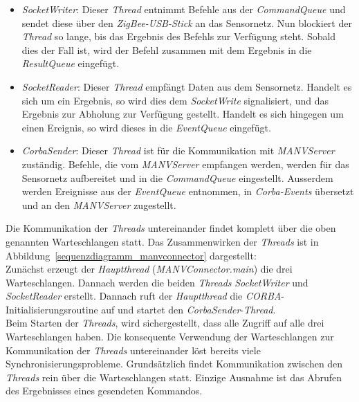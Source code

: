\begin{itemize}
    \item{\emph{SocketWriter}:} Dieser \emph{Thread} entnimmt Befehle aus der \emph{CommandQueue} und sendet
                         diese über den \emph{ZigBee-USB-Stick} an das Sensornetz. Nun blockiert der
                         \emph{Thread} so lange, bis das Ergebnis des Befehls zur Verfügung steht.
                         Sobald dies der Fall ist, wird der Befehl zusammen mit dem Ergebnis in
                         die \emph{ResultQueue} eingefügt.
    \item{\emph{SocketReader}:} Dieser \emph{Thread} empfängt Daten aus dem Sensornetz. Handelt es sich um ein
                         Ergebnis, so wird dies dem \emph{SocketWrite} signalisiert, und das
                         Ergebnis zur Abholung zur Verfügung gestellt. Handelt es sich hingegen um einen 
                         Ereignis, so wird dieses
                         in die \emph{EventQueue} eingefügt.
    \item{\emph{CorbaSender}:} Dieser \emph{Thread} ist für die Kommunikation mit \emph{MANVServer} zuständig.
                         Befehle, die vom \emph{MANVServer} empfangen werden, werden für das 
                         Sensornetz aufbereitet und in die \emph{CommandQueue} eingestellt.
                         Ausserdem werden Ereignisse aus der \textsl{EventQueue} entnommen,
                         in \emph{Corba-Events} übersetzt und an den \emph{MANVServer} zugestellt.
\end{itemize}                          

Die Kommunikation der \emph{Threads} untereinander findet komplett über die oben genannten Warteschlangen statt. Das 
Zusammenwirken der \emph{Threads} ist in Abbildung~\ref{sequenzdiagramm_manvconnector} dargestellt:\\

Zunächst erzeugt der \emph{Hauptthread} (\emph{MANVConnector.main}) die drei Warteschlangen. Dannach werden die beiden 
\emph{Threads} \emph{SocketWriter} und \emph{SocketReader} erstellt. Dannach ruft der 
\emph{Hauptthread} die \emph{CORBA}-Initialisierungsroutine auf und startet den \emph{CorbaSender}-\emph{Thread}.\\

Beim Starten der \emph{Threads}, wird sichergestellt, dass alle Zugriff auf alle drei Warteschlangen haben. Die konsequente 
Verwendung der Warteschlangen zur Kommunikation der \emph{Threads} untereinander löst bereits viele 
Synchronisierungsprobleme. Grundsätzlich findet Kommunikation zwischen den \emph{Threads} rein über die Warteschlangen 
statt. Einzige Ausnahme ist das Abrufen des Ergebnisses eines gesendeten Kommandos. 

